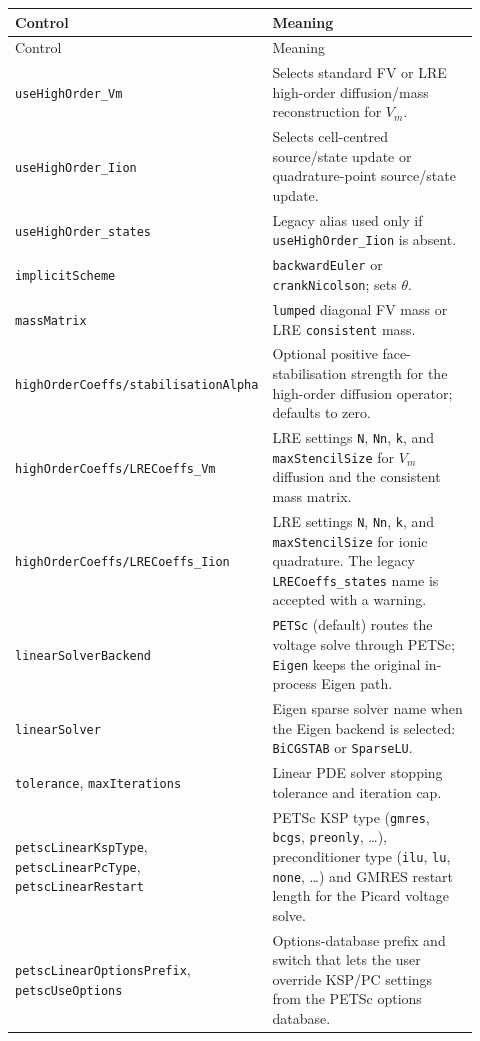 \documentclass[11pt,a4paper]{article}
\newcommand{\code}[1]{\texttt{\small #1}}
\newcommand{\Vm}{V_m}
\begin{document}
\begin{longtable}{@{}p{0.34\linewidth}p{0.58\linewidth}@{}}
\toprule
Control & Meaning \\
\midrule
\endfirsthead
\toprule
Control & Meaning \\
\midrule
\endhead
\code{useHighOrder\_Vm} & Selects standard FV or LRE high-order diffusion/mass reconstruction for $\Vm$. \\
\code{useHighOrder\_Iion} & Selects cell-centred source/state update or quadrature-point source/state update. \\
\code{useHighOrder\_states} & Legacy alias used only if \code{useHighOrder\_Iion} is absent. \\
\code{implicitScheme} & \code{backwardEuler} or \code{crankNicolson}; sets $\theta$. \\
\code{massMatrix} & \code{lumped} diagonal FV mass or LRE \code{consistent} mass. \\
\code{highOrderCoeffs/stabilisationAlpha} & Optional positive face-stabilisation strength for the high-order diffusion operator; defaults to zero. \\
\code{highOrderCoeffs/LRECoeffs\_Vm} & LRE settings \code{N}, \code{Nn}, \code{k}, and \code{maxStencilSize} for $\Vm$ diffusion and the consistent mass matrix. \\
\code{highOrderCoeffs/LRECoeffs\_Iion} & LRE settings \code{N}, \code{Nn}, \code{k}, and \code{maxStencilSize} for ionic quadrature. The legacy \code{LRECoeffs\_states} name is accepted with a warning. \\
\code{linearSolverBackend} & \code{PETSc} (default) routes the voltage solve through PETSc; \code{Eigen} keeps the original in-process Eigen path. \\
\code{linearSolver} & Eigen sparse solver name when the Eigen backend is selected: \code{BiCGSTAB} or \code{SparseLU}. \\
\code{tolerance}, \code{maxIterations} & Linear PDE solver stopping tolerance and iteration cap. \\
\code{petscLinearKspType}, \code{petscLinearPcType}, \code{petscLinearRestart} & PETSc KSP type (\code{gmres}, \code{bcgs}, \code{preonly}, \ldots), preconditioner type (\code{ilu}, \code{lu}, \code{none}, \ldots) and GMRES restart length for the Picard voltage solve. \\
\code{petscLinearOptionsPrefix}, \code{petscUseOptions} & Options-database prefix and switch that lets the user override KSP/PC settings from the PETSc options database. \\

\end{longtable}
\end{document}
